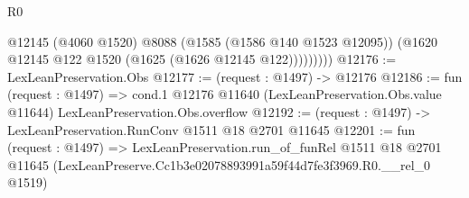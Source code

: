 \begin{lexlean}{R0}
\begin{coremodule}
                @12145
                (@4060 @1520)
                @8088
                (@1585 (@1586 @140 @1523 @12095))
                (@1620 @12145 @122 @1520 (@1625 (@1626 @12145 @122)))))))))
@12176 := LexLeanPreservation.Obs
@12177 := (request : @1497) -> @12176
@12186 := fun (request : @1497) =>
  cond.{1} @12176 @11640 (LexLeanPreservation.Obs.value @11644) LexLeanPreservation.Obs.overflow
@12192 := (request : @1497) -> LexLeanPreservation.RunConv @1511 @18 @2701 @11645
@12201 := fun (request : @1497) =>
  LexLeanPreservation.run_of_funRel
    @1511
    @18
    @2701
    @11645
    (LexLeanPreserve.Cc1b3e02078893991a59f44d7fe3f3969.R0.__rel_0 @1519)
\end{coremodule}
\end{lexlean}
